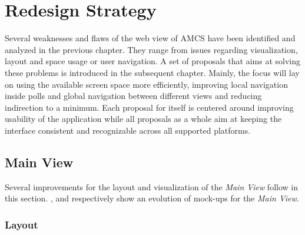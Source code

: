 \chapter{Redesign Strategy}
\label{chapter:redesignstrategy}
Several weaknesses and flaws of the web view of AMCS have been identified and analyzed in the previous chapter. They range from issues regarding visualization, layout and space usage or user navigation.
A set of proposals that aims at solving these problems is introduced in the subsequent chapter. Mainly, the focus will lay on using the available screen space more efficiently, improving local navigation inside polls and global navigation between different views and reducing indirection to a minimum. Each proposal for itself is centered around improving usability of the application while all proposals as a whole aim at keeping the interface consistent and recognizable across all supported platforms.

\section{Main View}

Several improvements for the layout and visualization of the \emph{Main View} follow in this section. ,  and  respectively show an evolution of mock-ups for the \emph{Main View}.
\subsection{Layout}
\label{section:con:proposals:mainview:layout}
